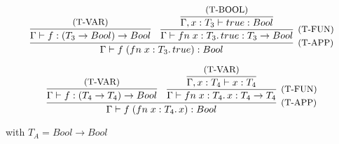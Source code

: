 \[
	\infer[\text{\small{(T-APP)}}]
	{
		\Gamma \vdash \APP{f}{(\FN{x: T_3}{true})}: Bool
	}
	{
		\infer{\Gamma \vdash f: (T_3 \to Bool) \to Bool}{\text{\small{(T-VAR)}}} &
		\infer[\text{\small{(T-FUN)}}]
		{\Gamma \vdash \FN{x: T_3}{true}: T_3 \to Bool}
		{
			\infer{\Gamma, x: T_3 \vdash true: Bool}{\text{\small{(T-BOOL)}}}
		}
	}
\]

\[
	\infer[\text{\small{(T-APP)}}]
	{
		\Gamma \vdash \APP{f}{(\FN{x: T_4}{x})}: Bool
	}
	{
		\infer{\Gamma \vdash f: (T_4 \to T_4) \to Bool}{\text{\small{(T-VAR)}}} &
		\infer[\text{\small{(T-FUN)}}]
		{\Gamma \vdash \FN{x: T_4}{x}: T_4 \to T_4}
		{\infer{\Gamma, x: T_4 \vdash x: T_4}{\text{\small{(T-VAR)}}}}
	}
\]

with $T_A = Bool \to Bool$

